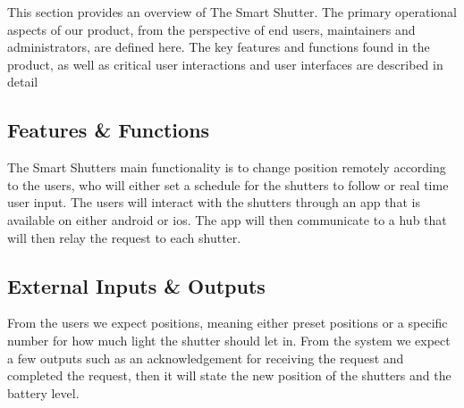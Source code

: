 This section provides an overview of The Smart Shutter. The primary operational aspects of our product, from the perspective of end users, maintainers and administrators, are defined here. The key features and functions found in the product, as well as critical user interactions and user interfaces are described in detail

\subsection{Features \& Functions}
The Smart Shutters main functionality is to change position remotely according to the users, who will either set a schedule for the shutters to follow or real time user input. The users will interact with the shutters through an app that is available on either android or ios. The app will then communicate to a hub that will then relay the request to each shutter. 


\subsection{External Inputs \& Outputs}
From the users we expect positions, meaning either preset positions or a specific number for how much light the shutter should let in. From the system we expect a few outputs such as an acknowledgement for receiving the request and completed the request, then it will state the new position of the shutters and the battery level. 

